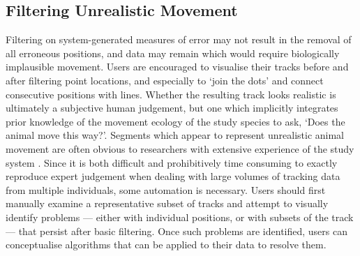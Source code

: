 \documentclass[10pt,paper=a4,headings=standardclasses
]{scrartcl}
\begin{document}
\subsection{Filtering Unrealistic Movement}

Filtering on system-generated measures of error may not result in the removal of all erroneous positions, and data may remain which would require biologically implausible movement.
Users are encouraged to visualise their tracks before and after filtering point locations, and especially to `join the dots' and connect consecutive positions with lines.
Whether the resulting track looks realistic is ultimately a subjective human judgement, but one which implicitly integrates prior knowledge of the movement ecology of the study species to ask, `Does the animal move this way?'.
Segments which appear to represent unrealistic animal movement are often obvious to researchers with extensive experience of the study system \citep[the non-movement approach; see][]{bjorneraas2010}.
Since it is both difficult and prohibitively time consuming to exactly reproduce expert judgement when dealing with large volumes of tracking data from multiple individuals, some automation is necessary.
Users should first manually examine a representative subset of tracks and attempt to visually identify problems --- either with individual positions, or with subsets of the track --- that persist after basic filtering.
Once such problems are identified, users can conceptualise algorithms that can be applied to their data to resolve them.
\end{document}
